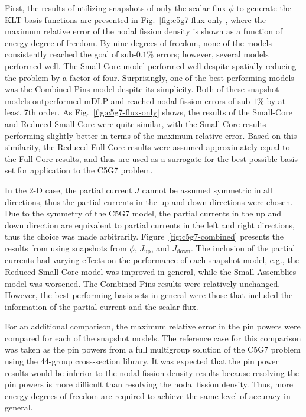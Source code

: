 \documentclass[5p,times,twocolumn,10pt]{elsarticle}
\newcommand{\FIG}[1]{Fig.~\ref{#1}}               %
\newcommand{\FIGURE}[1]{Figure~\ref{#1}}
\begin{document}
First, the results of utilizing snapshots of only the scalar flux 
$\phi$ to generate the KLT basis functions are presented in 
\FIG{fig:c5g7-flux-only}, where the maximum relative error of the 
nodal fission density is shown as a function of energy degree of freedom.  
By nine degrees of freedom, none of the models consistently reached the goal of 
sub-$0.1\%$ errors; however, several models performed well.  The 
Small-Core model performed well despite spatially reducing the problem by a factor 
of four.  Surprisingly, one of the best performing models was the Combined-Pins model despite its 
simplicity. Both of these snapshot models outperformed mDLP and 
reached nodal fission errors of sub-$1\%$ by at least 7th order.  
As \FIG{fig:c5g7-flux-only} shows, the results of the Small-Core and 
Reduced Small-Core were quite similar, with the Small-Core results performing 
slightly better in terms of the maximum relative error.  Based on this 
similarity, the Reduced Full-Core results were assumed
approximately equal to the Full-Core results, and thus are used as a 
surrogate for the best possible basis set for application to the C5G7 problem.

In the 2-D case, the partial current $J$ cannot be assumed symmetric in all directions,
thus the partial currents in the up and down directions were chosen.  
Due to the symmetry of the C5G7 model, the partial currents in the up and down
direction are equivalent to partial currents in the left and right directions,
thus the choice was made arbitrarily.  
\FIGURE{fig:c5g7-combined} presents the results from using snapshots from 
$\phi$, $J_{\text{up}}$, and $J_{\text{down}}$.  The inclusion of the 
partial currents had varying effects on the performance of each snapshot model, e.g., the Reduced 
Small-Core model was improved in general, while the Small-Assemblies model was worsened.  The 
Combined-Pins results were relatively unchanged. However, the best performing basis sets in general were those that included 
the information of the partial current and the scalar flux.

For an additional comparison, the maximum relative error 
in the pin powers were compared for each of the snapshot models.  The reference 
case for this comparison was taken as the pin powers from a full multigroup 
solution of the C5G7 problem using the 44-group cross-section 
library.  It was expected that the pin power results would be inferior to the 
nodal fission density results because resolving the pin powers is more difficult 
than resolving the nodal fission density.  Thus, more energy degrees of freedom 
are required to achieve the same level of accuracy in general. 
\end{document}
